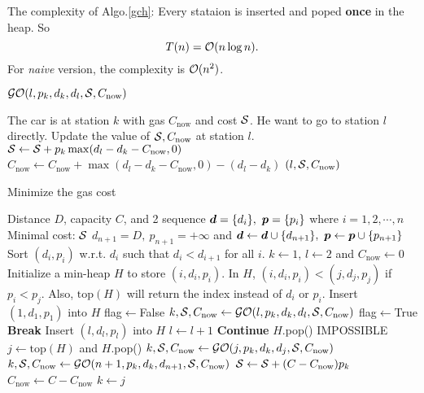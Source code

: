 \documentclass{article}
\begin{document}
The complexity of Algo.\ref{gch}: Every stataion is inserted and poped \textbf{once} in the heap. So \[T(n)=\mathcal{O}(n\log n).\]For \textit{naive} version, the complexity is $\mathcal{O}(n^2)$.
\begin{algorithm}[htbp]
	\caption{$\mathcal{GO}(l,p_k,d_k,d_l,\mathcal{S},C_{\mathrm{now}})$}
	\label{go}
	\begin{algorithmic}[1]
		\renewcommand{\algorithmicrequire}{\textbf{Input:}}
		\renewcommand{\algorithmicensure}{\textbf{Output:}}
		\renewcommand{\algorithmiccomment}[1]{\hfill\textit{\textcolor{blue}{\##1}}}
		\REQUIRE The car is at station $k$ with gas $C_{\mathrm{now}}$ and cost $\mathcal{S}$. He want to go to station  $l$ directly.
		\ENSURE Update the value of $\mathcal{S},C_{\mathrm{now}}$ at station $l$.
		\STATE $\mathcal{S}\gets\mathcal{S}+p_k\max(d_l-d_k-C_{\mathrm{now}},0)$
		\STATE $C_{\mathrm{now}}\gets C_{\mathrm{now}}+\max(d_l-d_k-C_{\mathrm{now}},0)-(d_l-d_k)$
		\RETURN $(l,\mathcal{S},C_{\mathrm{now}})$
	\end{algorithmic} 
\end{algorithm}
\begin{algorithm}[htbp]
	\caption{Minimize the gas cost}
	\label{gch}
	\begin{algorithmic}[1]
		\renewcommand{\algorithmicrequire}{\textbf{Input:}}
		\renewcommand{\algorithmicensure}{\textbf{Output:}}
		\renewcommand{\algorithmiccomment}[1]{\hfill\textit{\textcolor{blue}{\##1}}}
		\REQUIRE Distance $D$, capacity  $C$, and 2 sequence $\*d=\{d_i\},\ \*p=\{p_i\}$  where  $i=1,2,\cdots,n$
		\ENSURE Minimal cost: $\mathcal{S}$
		\STATE $d_{n+1}=D,\ p_{n+1}=+\infty$ and $\*d\gets\*d\cup\{d_{n+1}\},\ \*p\gets\*p\cup\{p_{n+1}\}$
		\STATE Sort $(d_i,p_i)$ w.r.t. $d_i$ such that $d_i<d_{i+1}$ for all $i$.
		\STATE $k\gets 1$, $l\gets 2$ and $C_{\mathrm{now}}\gets 0$
		\STATE Initialize a min-heap $H$ to store $(i,d_i,p_i)$.
		\STATE In $H$, $(i,d_i,p_i)<(j,d_j,p_j)$ if $p_i<p_j$. Also, $\mathrm{top}(H)$ will return the index instead of $d_i$ or $p_i$.
		\STATE Insert $(1,d_1,p_1)$ into $H$
		\STATE flag$\gets$False
		\STATE $k,\mathcal{S},C_{\mathrm{now}}\gets\mathcal{GO}(l,p_k,d_k,d_l,\mathcal{S},C_{\mathrm{now}})$
		\STATE flag$\gets$True
		\STATE \textbf{Break}
		\ENDIF
		\STATE Insert $(l,d_l,p_l)$ into $H$
		\STATE  $l\gets l+1$
		\ENDWHILE
		\STATE \textbf{Continue}
		\ENDIF
		\STATE $H$.pop()
		\ENDWHILE
		\RETURN IMPOSSIBLE
		\ENDIF
		\STATE $j\gets \mathrm{top}(H)$ and $H$.pop()
		\STATE $k,\mathcal{S},C_{\mathrm{now}}\gets\mathcal{GO}(j,p_k,d_k,d_j,\mathcal{S},C_{\mathrm{now}})$
		\ELSE
			\STATE $k,\mathcal{S},C_{\mathrm{now}}\gets\mathcal{GO}(n+1,p_k,d_k,d_{n+1},\mathcal{S},C_{\mathrm{now}})$
			\ELSE
				\STATE $\mathcal{S}\gets\mathcal{S}+(C-C_{\mathrm{now}})p_k$
				\STATE $C_{\mathrm{now}}\gets C-C_{\mathrm{now}}$
				\STATE $k\gets j$
			\ENDIF
		\ENDIF
		\ENDWHILE
	\end{algorithmic} 
\end{algorithm}
\end{document}
